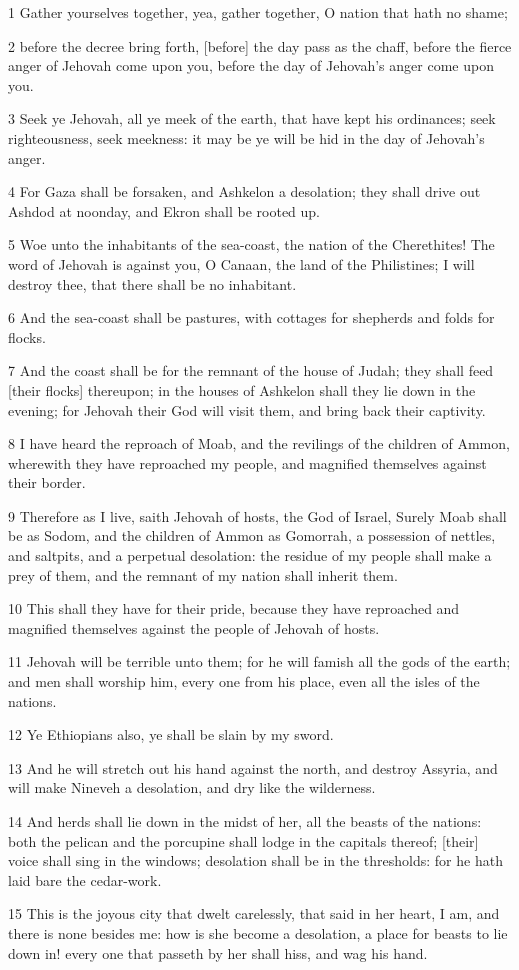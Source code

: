 \par 1 Gather yourselves together, yea, gather together, O nation that hath no shame;
\par 2 before the decree bring forth, [before] the day pass as the chaff, before the fierce anger of Jehovah come upon you, before the day of Jehovah's anger come upon you.
\par 3 Seek ye Jehovah, all ye meek of the earth, that have kept his ordinances; seek righteousness, seek meekness: it may be ye will be hid in the day of Jehovah's anger.
\par 4 For Gaza shall be forsaken, and Ashkelon a desolation; they shall drive out Ashdod at noonday, and Ekron shall be rooted up.
\par 5 Woe unto the inhabitants of the sea-coast, the nation of the Cherethites! The word of Jehovah is against you, O Canaan, the land of the Philistines; I will destroy thee, that there shall be no inhabitant.
\par 6 And the sea-coast shall be pastures, with cottages for shepherds and folds for flocks.
\par 7 And the coast shall be for the remnant of the house of Judah; they shall feed [their flocks] thereupon; in the houses of Ashkelon shall they lie down in the evening; for Jehovah their God will visit them, and bring back their captivity.
\par 8 I have heard the reproach of Moab, and the revilings of the children of Ammon, wherewith they have reproached my people, and magnified themselves against their border.
\par 9 Therefore as I live, saith Jehovah of hosts, the God of Israel, Surely Moab shall be as Sodom, and the children of Ammon as Gomorrah, a possession of nettles, and saltpits, and a perpetual desolation: the residue of my people shall make a prey of them, and the remnant of my nation shall inherit them.
\par 10 This shall they have for their pride, because they have reproached and magnified themselves against the people of Jehovah of hosts.
\par 11 Jehovah will be terrible unto them; for he will famish all the gods of the earth; and men shall worship him, every one from his place, even all the isles of the nations.
\par 12 Ye Ethiopians also, ye shall be slain by my sword.
\par 13 And he will stretch out his hand against the north, and destroy Assyria, and will make Nineveh a desolation, and dry like the wilderness.
\par 14 And herds shall lie down in the midst of her, all the beasts of the nations: both the pelican and the porcupine shall lodge in the capitals thereof; [their] voice shall sing in the windows; desolation shall be in the thresholds: for he hath laid bare the cedar-work.
\par 15 This is the joyous city that dwelt carelessly, that said in her heart, I am, and there is none besides me: how is she become a desolation, a place for beasts to lie down in! every one that passeth by her shall hiss, and wag his hand.


